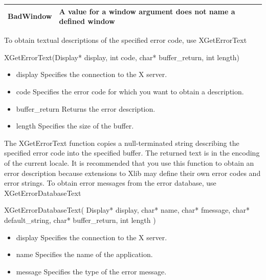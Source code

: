 \documentclass{report}
\begin{document}
\begin{itemize}
\begin{center}
\begin{tabularx}{\textwidth}{@{}lXl@{}}
                    BadWindow& A value for a window argument does not name a defined window \\
                    \bottomrule
                \end{tabularx}
            \end{center}
            To obtain textual descriptions of the specified error code, use XGetErrorText
            \bigbreak \noindent 
            \begin{cppcode}
                XGetErrorText(Display* display, int code, char* buffer_return, int length)
            \end{cppcode}
            \bigbreak \noindent
            \begin{itemize}
                \item display Specifies the connection to the X server.
                \item code Specifies the error code for which you want to obtain a description.
                \item buffer\_return Returns the error description.
                \item length Specifies the size of the buffer.
            \end{itemize}
            The XGetErrorText function copies a null-terminated string describing the specified error code into the specified buffer. The returned text is in the encoding of the current locale. It is recommended that you use this function to obtain an error description because extensions to Xlib may define their own error codes and error strings.
            \bigbreak \noindent 
            To obtain error messages from the error database, use XGetErrorDatabaseText
            \bigbreak \noindent 
            \begin{cppcode}
                XGetErrorDatabaseText(
                    Display* display,
                    char* name,
                    char* fmessage,
                    char* default_string,
                    char* buffer_return,
                    int length
                )
            \end{cppcode}
            \bigbreak \noindent
            \begin{itemize}
                \item display Specifies the connection to the X server.
                \item name Specifies the name of the application.
                \item message Specifies the type of the error message.

\end{itemize}
\end{itemize}
\end{document}
